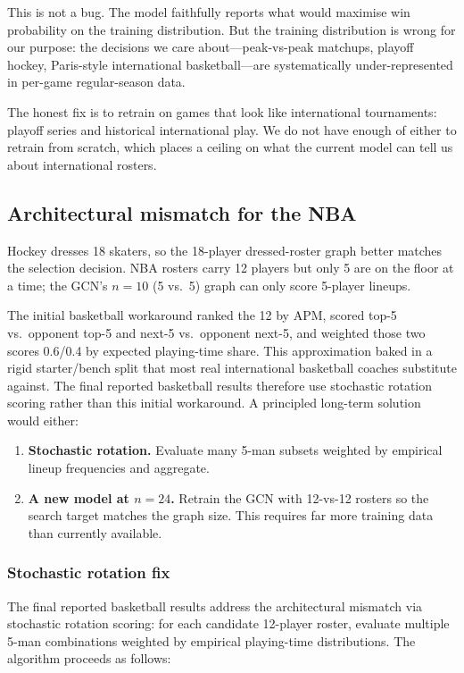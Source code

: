 \documentclass[12pt,letterpaper]{article}
\begin{document}
This is not a bug.
The model faithfully reports what would maximise win probability on the
training distribution.
But the training distribution is wrong for our purpose: the decisions
we care about---peak-vs-peak matchups, playoff hockey, Paris-style
international basketball---are systematically under-represented in
per-game regular-season data.

The honest fix is to retrain on games that look like international
tournaments: playoff series and historical international play.
We do not have enough of either to retrain from scratch, which places
a ceiling on what the current model can tell us about international
rosters.

\subsection{Architectural mismatch for the NBA}
\label{sec:arch-mismatch}

Hockey dresses 18 skaters, so the 18-player dressed-roster graph better
matches the selection decision.
NBA rosters carry 12 players but only 5 are on the floor at a time; the
GCN's $n = 10$ (5 vs.\ 5) graph can only score 5-player lineups.

The initial basketball workaround ranked the 12 by APM, scored top-5
vs.\ opponent top-5 and next-5 vs.\ opponent next-5, and weighted those
two scores 0.6/0.4 by expected playing-time share.
This approximation baked in a rigid starter/bench split that most real
international basketball coaches substitute against.
The final reported basketball results therefore use stochastic rotation
scoring rather than this initial workaround.
A principled long-term solution would either:

\begin{enumerate}[leftmargin=*]
  \item \textbf{Stochastic rotation.} Evaluate many 5-man subsets
    weighted by empirical lineup frequencies and aggregate.
  \item \textbf{A new model at $n = 24$.} Retrain the GCN with
    12-vs-12 rosters so the search target matches the graph size.
    This requires far more training data than currently available.
\end{enumerate}

\subsubsection{Stochastic rotation fix}

The final reported basketball results address the architectural mismatch
via stochastic rotation scoring: for each candidate 12-player roster,
evaluate multiple 5-man combinations weighted by empirical
playing-time distributions.
The algorithm proceeds as follows:
\end{document}
